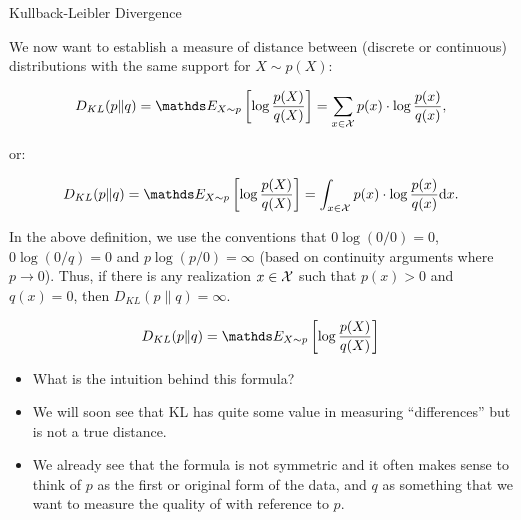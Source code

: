 \documentclass[11pt,compress,t,notes=noshow, xcolor=table]{beamer}
\begin{document}
    

\begin{vbframe} {Kullback-Leibler Divergence}

We now want to establish a measure of distance between (discrete or continuous) distributions with the same support for $X \sim p(X)$:

  $$ D_{KL}(p \| q) = \E_{X \sim p} \left[\log \frac{p(X)}{q(X)}\right] = \sum_{x \in \Xspace} p(x) \cdot \log \frac{p(x)}{q(x)}, $$
  
  or: 
  
  $$ D_{KL}(p \| q) = \E_{X \sim p} \left[\log \frac{p(X)}{q(X)}\right] = \int_{x \in \Xspace} p(x) \cdot \log \frac{p(x)}{q(x)} \mathrm{d}x. $$

In the above definition, we use the conventions that $0 \log (0/0) = 0$, $0 \log (0/q) = 0$ and $p \log(p/0) = \infty$ (based on continuity arguments where $p \to 0$). 
Thus, if there is any realization $x \in \mathcal{X}$ such that $p(x) > 0$ and $q(x) = 0$,
then $D_{KL}(p \| q) = \infty.$
  
\framebreak

$$ D_{KL}(p \| q) = \E_{X \sim p} \left[\log \frac{p(X)}{q(X)}\right] $$

\begin{itemize}
  \item  What is the intuition behind this formula?  
  \item  We will soon see that KL has quite some value in measuring \enquote{differences} but is not a true distance. 
  \item  We already see that the formula is not symmetric and it often makes sense to think of $p$ as the first or original form of the data,
    and $q$ as something that we want to measure the quality of with reference to $p$.
  \end{itemize}

\end{vbframe}
\end{document}
